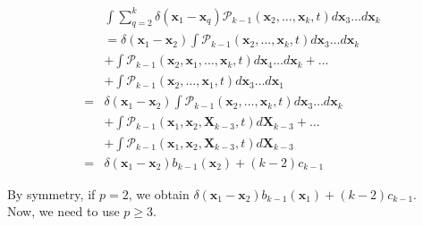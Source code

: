 \begin{subequations} 
\begin{flalign}
& \int \sum_{q=2}^{k}\delta({\boldsymbol{x}_1-\boldsymbol{x}_q})\mathcal{P}_{k-1}(\boldsymbol{x}_{2},\ldots,\boldsymbol{x}_{k},t) d\boldsymbol{x}_{3}\ldots d\boldsymbol{x}_{k}\\
& =  \delta(\boldsymbol{x}_{1}-\boldsymbol{x}_{2})\int\mathcal{P}_{k-1}(\boldsymbol{x}_{2},\ldots,\boldsymbol{x}_{k},t)d\boldsymbol{x}_{3}\ldots d\boldsymbol{x}_{k}\\
&+ \int\mathcal{P}_{k-1}(\boldsymbol{x}_{2},\boldsymbol{x}_{1},\ldots,\boldsymbol{x}_{k},t)d\boldsymbol{x}_{4}\ldots d\boldsymbol{x}_{k} + \ldots \\
& +\int\mathcal{P}_{k-1}(\boldsymbol{x}_{2},\ldots,\boldsymbol{x}_{1},t)d\boldsymbol{x}_{3}\ldots d\boldsymbol{x}_{1}\\
=&\delta(\boldsymbol{x}_{1}-\boldsymbol{x}_{2})\int\mathcal{P}_{k-1}(\boldsymbol{x}_{2},\ldots,\boldsymbol{x}_{k},t)d\boldsymbol{x}_{3}\ldots d\boldsymbol{x}_{k}\\
 & +\int\mathcal{P}_{k-1}(\boldsymbol{x}_{1},\boldsymbol{x}_{2},\boldsymbol{X}_{k-3},t)d\boldsymbol{X}_{k-3}+\ldots\\
 & +\int\mathcal{P}_{k-1}(\boldsymbol{x}_{1},\boldsymbol{x}_{2},\boldsymbol{X}_{k-3},t)d\boldsymbol{X}_{k-3}\\
= & \delta(\boldsymbol{x}_{1}-\boldsymbol{x}_{2})b_{k-1}(\boldsymbol{x}_{2})+(k-2)c_{k-1}
\end{flalign}
\end{subequations}

By symmetry, if $p=2$, we obtain $\delta(\boldsymbol{x}_{1}-\boldsymbol{x}_{2})b_{k-1}(\boldsymbol{x}_{1})+(k-2)c_{k-1}$.\\

Now, we need to use $p\geq3$.

